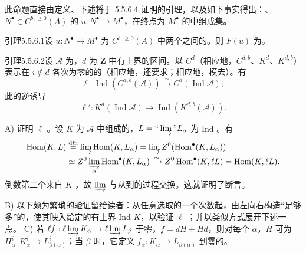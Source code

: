 此命题直接由定义、下述将于 5.5.6.4 证明的引理，以及如下事实得出：、$N^\bullet\in C^{b,\geq0}(A)$ 的 $u:N^\bullet\to M^\bullet$，在终点为 $M^\bullet$ 的中组成集。
\begin{SGAresult}{引理}{5.5.6.1}设 $u:N^\bullet\to M^\bullet$ 为 $C^{b,\geq0}(A)$ 中两个之间的。则 $F(u)$ 为。\end{SGAresult}
\begin{SGAresult}{引理}{5.5.6.2}设 $\mathscr A$ 为，$d$ 为 $\mathbf Z$ 中有上界的区间。以 $C^d$（相应地，$C^{d,b}$、$K^d$、$K^{d,b}$）表示在 $i\notin d$ 各次为零的的（相应地，还要求；相应地，模去）。有
\[\ell:\operatorname{Ind}(C^{d,b}(\mathscr A))\xrightarrow\sim C^d(\operatorname{Ind}\mathscr A);\]
此的逆诱导
\[\ell':K^d(\operatorname{Ind}\mathscr A)\longrightarrow\operatorname{Ind}(K^{d,b}(\mathscr A)).\]
\end{SGAresult}
A) 证明 $\ell$ 。设 $K$ 为 $\mathscr A$ 中组成的，$L=\text{“}\varinjlim\text{”}L_\alpha$ 为 Ind 。有
\[\begin{aligned}
\operatorname{Hom}(K,L)&\overset{\mathrm{dfn}}=\varinjlim\operatorname{Hom}(K,L_\alpha)=\varinjlim Z^0(\operatorname{Hom}^\bullet(K,L_\alpha))\\
&\simeq Z^0\varinjlim_\alpha\operatorname{Hom}^\bullet(K,L_\alpha)\xrightarrow\sim Z^0\operatorname{Hom}^\bullet(K,\ell L)=\operatorname{Hom}(K,\ell L).
\end{aligned}\]
倒数第二个来自 $K$ ，故 $\varinjlim$ 与从到的过程交换。这就证明了断言。

B) 以下颇为繁琐的验证留给读者：从任意选取的一个次数起，由左向右构造“足够多”的，使其映入给定的有上界 Ind  $K$，以验证 $\ell$ ；并以类似方式展开下述一点。
C) 若 $\ell f:\ell\varinjlim K_\alpha\to\ell\varinjlim L_\beta$ 于零，$f=dH+Hd$，则对每个 $\alpha$，$H$ 可为 $H^i_\alpha:K^i_\alpha\to L^i_{\beta(\alpha)}$；当 $\beta$ 时，它定义 $f_\alpha:K_\alpha\to L_{\beta(\alpha)}$ 到零的。


